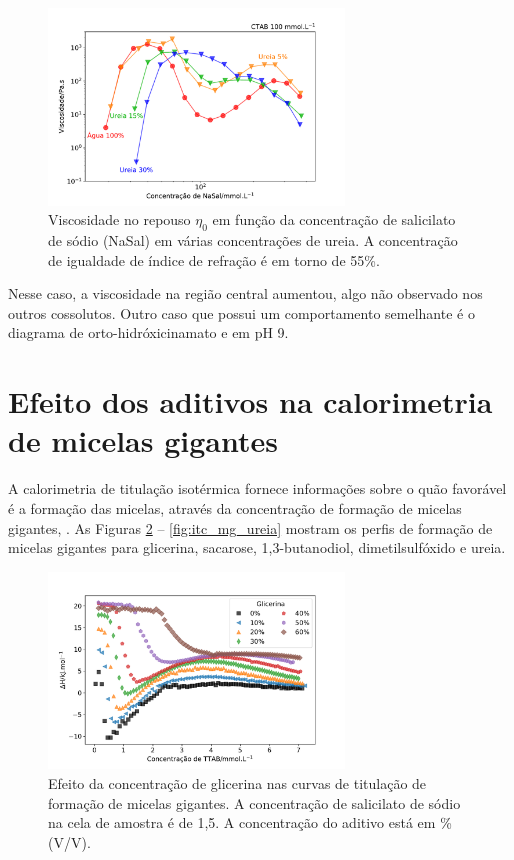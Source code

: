			\begin{figure}[h]
				\centering
				\includegraphics[width=0.7\textwidth]{imagens/reologia/RH_ureia}
				\caption{Viscosidade no repouso \(\eta_0\) em função da concentração de salicilato de sódio (NaSal) em várias concentrações de ureia. A concentração de igualdade de índice de refração é em torno de 55\%.}
				\label{fig:rh_ureia}
			\end{figure}

			Nesse caso, a viscosidade na região central aumentou, algo não observado nos outros cossolutos. Outro caso que possui um comportamento semelhante é o diagrama de orto-hidróxicinamato e \CTAB{} em pH 9. %
		
		\FloatBarrier
		
		\section{Efeito dos aditivos na calorimetria de micelas gigantes}
		
			A calorimetria de titulação isotérmica fornece informações sobre o quão favorável é a formação das micelas, através da concentração de formação de micelas gigantes, \cwlm. As Figuras \ref{fig:itc_mg_glicerina} -- \ref{fig:itc_mg_ureia} mostram os perfis de formação de micelas gigantes para glicerina, sacarose, 1,3-butanodiol, dimetilsulfóxido e ureia.
		
			\begin{figure}[h]
				\centering
				\includegraphics[width=0.7\textwidth]{imagens/itc/ITC_MG_glic}
				\caption{Efeito da concentração de glicerina nas curvas de titulação de formação de micelas gigantes. A concentração de salicilato de sódio na cela de amostra é de 1,5\mM. A concentração do aditivo está em \% (V/V).}
				\label{fig:itc_mg_glicerina}
			\end{figure}  %
			
